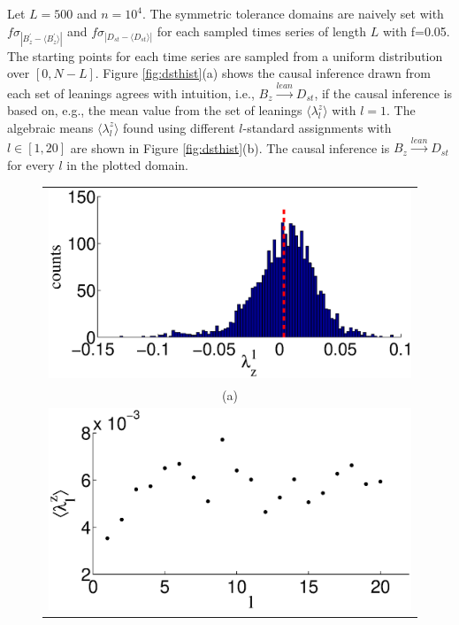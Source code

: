 \documentclass[twocolumn,aps,pre,groupedaddress]{revtex4-1}
\begin{document}
Let $L=500$ and $n=10^4$.  The symmetric tolerance domains are naively set with $f\sigma_{|B_{z}^\prime-\langle B_{z}^\prime\rangle|}$ and $f\sigma_{|D_{st}-\langle D_{st}\rangle|}$ for each sampled times series of length $L$ with f=0.05.  The starting points for each time series are sampled from a uniform distribution over $[0,N-L]$.  Figure \ref{fig:dsthist}(a) shows the causal inference drawn from each set of leanings agrees with intuition, i.e., $B_{z}\xrightarrow{lean}D_{st}$, if the causal inference is based on, e.g., the mean value from the set of leanings $\langle\lambda^z_l\rangle$ with $l=1$.  The algebraic means $\langle\lambda^z_l\rangle$ found using different $l$-standard assignments with $l\in[1,20]$ are shown in Figure \ref{fig:dsthist}(b).  The causal inference is $B_{z}\xrightarrow{lean}D_{st}$ for every $l$ in the plotted domain.
\begin{figure}[ht]
\begin{tabular}{c}
\includegraphics[scale=0.45]{SolarDataBzNormDst.eps} \\ 
(a) \\
\includegraphics[scale=0.45]{SolarDataBzNormDst_difflags.eps} \\ 

\end{tabular}
\end{figure}
\end{document}
